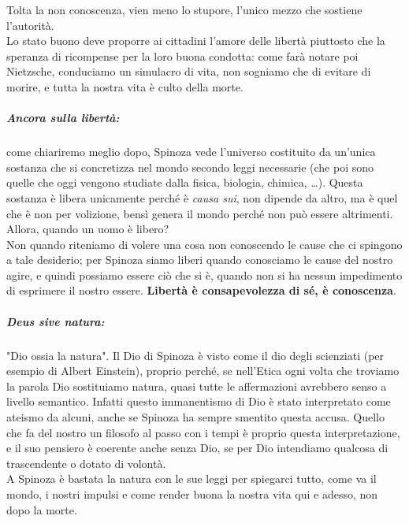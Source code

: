 Tolta la non conoscenza, vien meno lo stupore, l'unico mezzo che sostiene l'autorità.\\
Lo stato buono deve proporre ai cittadini l'amore delle libertà piuttosto che la speranza di ricompense per la loro buona condotta: come farà notare poi Nietzsche, conduciamo un simulacro di vita, non sogniamo che di evitare di morire, e tutta la nostra vita è culto della morte.
\subparagraph{Ancora sulla libertà:}come chiariremo meglio dopo, Spinoza vede l'universo costituito da un'unica sostanza che si concretizza nel mondo secondo leggi necessarie (che poi sono quelle che oggi vengono studiate dalla fisica, biologia, chimica, \dots). Questa sostanza è libera unicamente perché è \textit{causa sui}, non dipende da altro, ma è quel che è non per volizione, bensì genera il mondo perché non può essere altrimenti.\\
Allora, quando un uomo è libero?\\
 Non quando riteniamo di volere una cosa non conoscendo le cause che ci spingono a tale desiderio; per Spinoza siamo liberi quando conosciamo le cause del nostro agire, e quindi possiamo essere ciò che si è, quando non si ha nessun impedimento di esprimere il nostro essere. \textbf{Libertà è consapevolezza di sé, è conoscenza}.
\subparagraph{Deus sive natura:}"Dio ossia la natura". Il Dio di Spinoza è visto come il dio degli scienziati (per esempio di Albert Einstein), proprio perché, se nell'Etica ogni volta che troviamo la parola Dio sostituiamo natura, quasi tutte le affermazioni avrebbero senso a livello semantico. Infatti questo immanentismo di Dio è stato interpretato come ateismo da alcuni, anche se Spinoza ha sempre smentito questa accusa. Quello che fa del nostro un filosofo al passo con i tempi è proprio questa interpretazione, e il suo pensiero è coerente anche senza Dio, se per Dio intendiamo qualcosa di trascendente o dotato di volontà.\\
A Spinoza è bastata la natura con le sue leggi per spiegarci tutto, come va il mondo, i nostri impulsi e come render buona la nostra vita qui e adesso, non dopo la morte.
